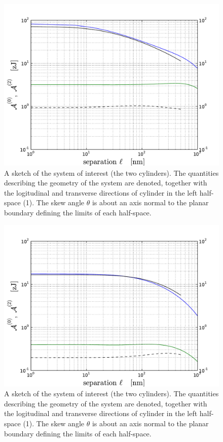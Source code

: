\documentclass[onecolumn,letterpaper,amsmath,amssymb,floatfix,aps,superscriptaddress]{revtex4}
\begin{document}
\begin{figure}
\centerline{\includegraphics[width=12cm]{140309_93w93_GH_skew_ret_A0_A2.pdf}}
\caption{A sketch of the system of interest (the two cylinders). The quantities describing the geometry of the system are 
denoted, together with the logitudinal and transverse directions of cylinder in the left half-space (1). The skew angle $\theta$ is about an axis normal to the planar boundary defining the limits of each half-space.
}
\label{fig:sketch}
\end{figure}

\begin{figure}
\centerline{\includegraphics[width=12cm]{140309_290w290_GH_skew_ret_A0_A2.pdf}}
\caption{A sketch of the system of interest (the two cylinders). The quantities describing the geometry of the system are 
denoted, together with the logitudinal and transverse directions of cylinder in the left half-space (1). The skew angle $\theta$ is about an axis normal to the planar boundary defining the limits of each half-space.
}
\label{fig:sketch}
\end{figure}
\end{document}
